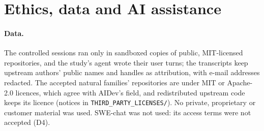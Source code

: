 \section{Ethics, data and AI assistance}
\label{sec:ethics}
\paragraph{Data.} The controlled sessions ran only in sandboxed copies of public, MIT-licensed repositories, and the study's agent wrote their user turns; the transcripts keep upstream authors' public names and handles as attribution, with e-mail addresses redacted. The accepted natural families' repositories are under MIT or Apache-2.0 licences, which agree with AIDev's field, and redistributed upstream code keeps its licence (notices in \texttt{THIRD\_PARTY\_LICENSES/}). No private, proprietary or customer material was used. SWE-chat was not used: its access terms were not accepted (D4).


